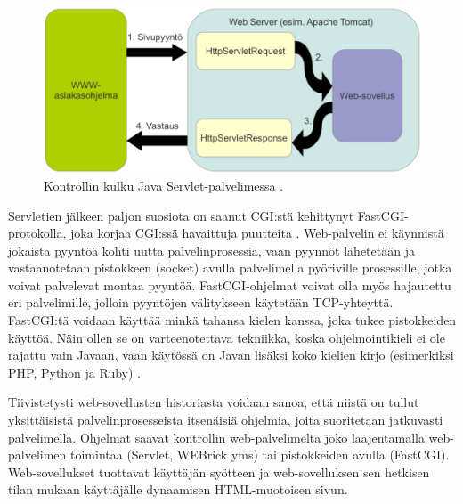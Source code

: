\begin{figure}[ht]
\centering
\includegraphics[width=\textwidth]{web/servlet.eps}
\caption{Kontrollin kulku Java Servlet-palvelimessa \cite{j2ee}.}%
\label{servlet}
\end{figure}

Servletien jälkeen paljon suosiota on saanut CGI:stä kehittynyt FastCGI-protokolla, joka korjaa CGI:ssä havaittuja puutteita \cite{fastcgi}. Web-palvelin ei käynnistä jokaista pyyntöä kohti uutta palvelinprosessia, vaan pyynnöt lähetetään ja vastaanotetaan pistokkeen (socket) avulla palvelimella pyöriville prosessille, jotka voivat palvelevat montaa pyyntöä. FastCGI-ohjelmat voivat olla myös hajautettu eri palvelimille, jolloin pyyntöjen välitykseen käytetään TCP-yhteyttä. FastCGI:tä voidaan käyttää minkä tahansa kielen kanssa, joka tukee pistokkeiden käyttöä. Näin ollen se on varteenotettava tekniikka, koska ohjelmointikieli ei ole rajattu vain Javaan, vaan käytössä on Javan lisäksi koko kielien kirjo (esimerkiksi PHP, Python ja Ruby) \cite{fastcgi}.

Tiivistetysti web-sovellusten historiasta voidaan sanoa, että niistä on tullut yksittäisistä palvelinprosesseista itsenäisiä ohjelmia, joita suoritetaan jatkuvasti palvelimella. Ohjelmat saavat kontrollin web-palvelimelta joko laajentamalla web-palvelimen toimintaa (Servlet, WEBrick yms) tai pistokkeiden avulla (FastCGI). Web-so\-vel\-luk\-set tuottavat käyttäjän syötteen ja web-sovelluksen sen hetkisen tilan mukaan käyttäjälle dynaamisen HTML-muotoisen sivun.